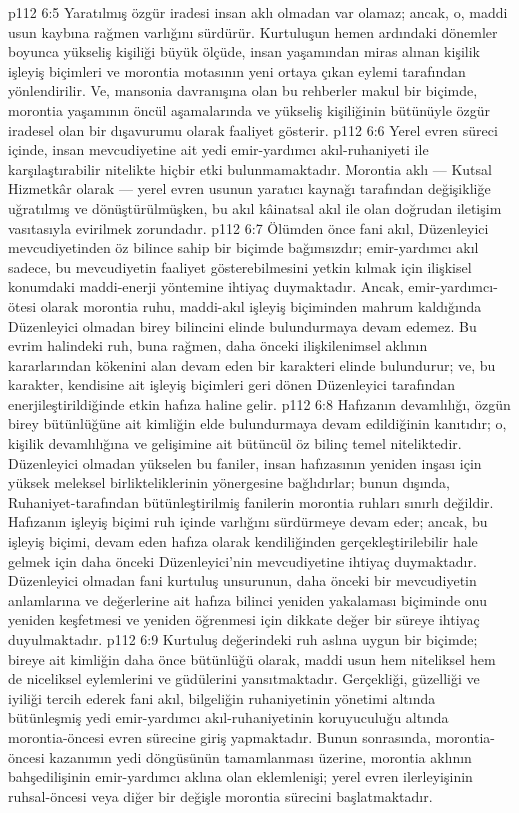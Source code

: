\vs p112 6:5 Yaratılmış özgür iradesi insan aklı olmadan var olamaz; ancak, o, maddi usun kaybına rağmen varlığını sürdürür. Kurtuluşun hemen ardındaki dönemler boyunca yükseliş kişiliği büyük ölçüde, insan yaşamından miras alınan kişilik işleyiş biçimleri ve morontia motasının yeni ortaya çıkan eylemi tarafından yönlendirilir. Ve, mansonia davranışına olan bu rehberler makul bir biçimde, morontia yaşamının öncül aşamalarında ve yükseliş kişiliğinin bütünüyle özgür iradesel olan bir dışavurumu olarak faaliyet gösterir.
\vs p112 6:6 Yerel evren süreci içinde, insan mevcudiyetine ait yedi emir\hyp{}yardımcı akıl\hyp{}ruhaniyeti ile karşılaştırabilir nitelikte hiçbir etki bulunmamaktadır. Morontia aklı --- Kutsal Hizmetkâr olarak --- yerel evren usunun yaratıcı kaynağı tarafından değişikliğe uğratılmış ve dönüştürülmüşken, bu akıl kâinatsal akıl ile olan doğrudan iletişim vasıtasıyla evirilmek zorundadır.
\vs p112 6:7 Ölümden önce fani akıl, Düzenleyici mevcudiyetinden öz bilince sahip bir biçimde bağımsızdır; emir\hyp{}yardımcı akıl sadece, bu mevcudiyetin faaliyet gösterebilmesini yetkin kılmak için ilişkisel konumdaki maddi\hyp{}enerji yöntemine ihtiyaç duymaktadır. Ancak, emir\hyp{}yardımcı\hyp{}ötesi olarak morontia ruhu, maddi\hyp{}akıl işleyiş biçiminden mahrum kaldığında Düzenleyici olmadan birey bilincini elinde bulundurmaya devam edemez. Bu evrim halindeki ruh, buna rağmen, daha önceki ilişkilenimsel aklının kararlarından kökenini alan devam eden bir karakteri elinde bulundurur; ve, bu karakter, kendisine ait işleyiş biçimleri geri dönen Düzenleyici tarafından enerjileştirildiğinde etkin hafıza haline gelir.
\vs p112 6:8 Hafızanın devamlılığı, özgün birey bütünlüğüne ait kimliğin elde bulundurmaya devam edildiğinin kanıtıdır; o, kişilik devamlılığına ve gelişimine ait bütüncül öz bilinç temel niteliktedir. Düzenleyici olmadan yükselen bu faniler, insan hafızasının yeniden inşası için yüksek meleksel birlikteliklerinin yönergesine bağlıdırlar; bunun dışında, Ruhaniyet\hyp{}tarafından bütünleştirilmiş fanilerin morontia ruhları sınırlı değildir. Hafızanın işleyiş biçimi ruh içinde varlığını sürdürmeye devam eder; ancak, bu işleyiş biçimi, devam eden hafıza olarak  kendiliğinden gerçekleştirilebilir hale gelmek için daha önceki Düzenleyici’nin mevcudiyetine ihtiyaç duymaktadır. Düzenleyici olmadan fani kurtuluş unsurunun, daha önceki bir mevcudiyetin anlamlarına ve değerlerine ait hafıza bilinci yeniden yakalaması biçiminde onu yeniden keşfetmesi ve yeniden öğrenmesi için dikkate değer bir süreye ihtiyaç duyulmaktadır.
\vs p112 6:9 Kurtuluş değerindeki ruh aslına uygun bir biçimde; bireye ait kimliğin daha önce bütünlüğü olarak, maddi usun hem niteliksel hem de niceliksel eylemlerini ve güdülerini yansıtmaktadır. Gerçekliği, güzelliği ve iyiliği tercih ederek fani akıl, bilgeliğin ruhaniyetinin yönetimi altında bütünleşmiş yedi emir\hyp{}yardımcı akıl\hyp{}ruhaniyetinin koruyuculuğu altında morontia\hyp{}öncesi evren sürecine giriş yapmaktadır. Bunun sonrasında, morontia\hyp{}öncesi kazanımın yedi döngüsünün tamamlanması üzerine, morontia aklının bahşedilişinin emir\hyp{}yardımcı aklına olan eklemlenişi; yerel evren ilerleyişinin ruhsal\hyp{}öncesi veya diğer bir değişle morontia sürecini başlatmaktadır.

